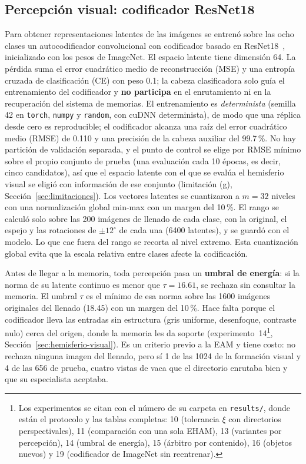 \subsection{Percepción visual: codificador ResNet18}
\label{sec:percepcion}

Para obtener representaciones latentes de las imágenes se entrenó sobre las ocho clases
un autocodificador convolucional con codificador basado en ResNet18~\cite{he2016resnet},
inicializado con los pesos de ImageNet.
El espacio latente tiene dimensión 64.
La pérdida suma el error cuadrático medio de reconstrucción (MSE) y una entropía
cruzada de clasificación (CE) con peso 0.1; la cabeza clasificadora solo guía el
entrenamiento del codificador y \textbf{no participa} en el enrutamiento ni en la
recuperación del sistema de memorias.
El entrenamiento es \emph{determinista} (semilla 42 en \texttt{torch}, \texttt{numpy} y
\texttt{random}, con cuDNN determinista), de modo que una réplica desde cero es
reproducible; el codificador alcanza una raíz del error cuadrático medio (RMSE) de 0.110 y
una precisión de la cabeza auxiliar del 99.7\,\%.
No hay partición de validación separada, y el punto de control se elige por RMSE mínimo
sobre el propio conjunto de prueba (una evaluación cada 10 épocas, es decir, cinco
candidatos), así que el espacio latente con el que se evalúa el hemisferio visual se
eligió con información de ese conjunto (limitación (g), Sección~\ref{sec:limitaciones}).
Los vectores latentes se cuantizaron a $m = 32$ niveles con una normalización global
min-max con un margen del 10\,\%.
El rango se calculó solo sobre las 200 imágenes de llenado de cada clase, con la
original, el espejo y las rotaciones de $\pm 12^{\circ}$ de cada una (6400 latentes), y
se guardó con el modelo.
Lo que cae fuera del rango se recorta al nivel extremo.
Esta cuantización global evita que la escala relativa entre clases afecte la codificación.

Antes de llegar a la memoria, toda percepción pasa un \textbf{umbral de energía}: si
la norma de su latente continuo es menor que $\tau = 16.61$, se rechaza sin consultar
la memoria.
El umbral $\tau$ es el mínimo de esa norma sobre las 1600 imágenes originales del llenado
(18.45) con un margen del 10\,\%. Hace falta porque el codificador lleva las entradas sin
estructura (gris uniforme, desenfoque, contraste nulo) cerca del origen, donde la
memoria les da soporte (experimento~14\footnote{Los
experimentos se citan con el número de su carpeta en \texttt{results/}, donde están el
protocolo y las tablas completas: 10 (tolerancia $\xi$ con directorios
perspectivales), 11 (comparación con una sola EHAM), 13 (variantes por percepción), 14
(umbral de energía), 15 (árbitro por contenido), 16 (objetos nuevos) y 19 (codificador
de ImageNet sin reentrenar).},
Sección~\ref{sec:hemisferio-visual}).
Es un criterio previo a la EAM y tiene costo: no rechaza ninguna imagen del llenado,
pero sí 1 de las 1024 de la formación visual y 4 de las 656 de prueba, cuatro vistas de vaca
que el directorio enrutaba bien y que su especialista aceptaba.

